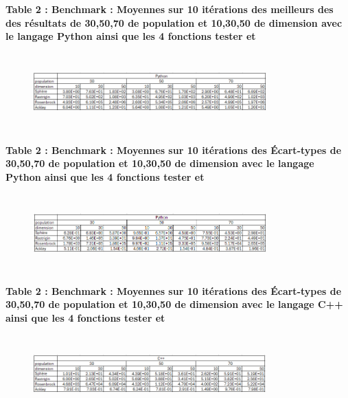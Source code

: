 \documentclass[conference]{IEEEtran}
\begin{document}
\textbf{Table 2  : Benchmark :  Moyennes sur 10 itérations des meilleurs des des résultats de 30,50,70 de population et 10,30,50 de dimension avec le langage Python ainsi que les 4 fonctions tester et }
\begin{figure}[H]
  \centering
  \includegraphics[width=9cm , height =3cm]{tabpy.png}
  
\end{figure}

\textbf{Table 2  : Benchmark :  Moyennes sur 10 itérations des Écart-types de 30,50,70 de population et 10,30,50 de dimension avec le langage Python ainsi que les 4 fonctions tester et }
\begin{figure}[H]
  \centering
  \includegraphics[width=9cm , height =3cm]{tabPyE.png}
  
\end{figure}


\textbf{Table 2  : Benchmark :  Moyennes sur 10 itérations des Écart-types de 30,50,70 de population et 10,30,50 de dimension avec le langage C++ ainsi que les 4 fonctions tester et }
\begin{figure}[H]
  \centering
  \includegraphics[width=9cm , height =3cm]{TabCEC.png}
  
\end{figure}
\end{document}
